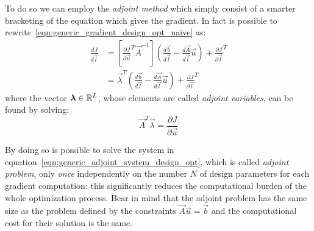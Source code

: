 \smallskip
To do so we can employ the \emph{adjoint method} which simply consist of a smarter bracketing of the equation which gives the gradient. In fact is possible to rewrite~\eqref{eqn:generic_gradient_design_opt_naive} as:
\begin{equation}
	\begin{aligned}
		\frac{dJ}{d\vec{l}} & = \left[ \frac{\partial J}{\partial \vec{u}}^T \vec{A}^{-1} \right] \left( \frac{d\vec{b}}{d\vec{l}} - \frac{d\vec{A}}{d\vec{l}}\vec{u} \right) + \frac{\partial J}{\partial \vec{l}}^T  \\[2ex]
		& = \vec{\lambda}^T \left( \frac{d\vec{b}}{d\vec{l}} - \frac{d\vec{A}}{d\vec{l}}\vec{u} \right) + \frac{\partial J}{\partial \vec{l}}^T
	\end{aligned}
\end{equation}
where the vector $\boldsymbol{\lambda} \in \mathbb{R}^L$, whose elements are called \emph{adjoint variables}, can be found by solving:
\begin{equation}
	\label{eqn:generic_adjoint_system_design_opt}
	\vec{A}^T \vec{\lambda} = \frac{\partial J}{\partial \vec{u}}
\end{equation}

By doing so is possible to solve the system in equation~\eqref{eqn:generic_adjoint_system_design_opt}, which is called \emph{adjoint problem}, only \emph{once} independently on the number $N$ of design parameters for each gradient computation: this significantly reduces the computational burden of the whole optimization process. Bear in mind that the adjoint problem has the same size as the problem defined by the constraints $\vec{A} \vec{u} = \vec{b}$ and the computational cost for their solution is the same.

